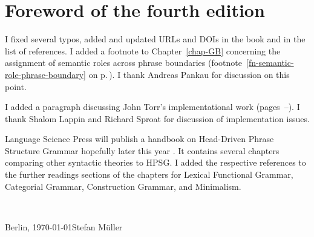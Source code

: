 
\section*{Foreword of the fourth edition}









I fixed several typos, added and updated URLs and DOIs in the book and in the list of references.
I added a footnote to Chapter~\ref{chap-GB} concerning the assignment of semantic roles
across phrase boundaries (footnote~\ref{fn-semantic-role-phrase-boundary} on
p.\,\pageref{fn-semantic-role-phrase-boundary}). I thank Andreas Pankau for discussion on this point.

I added a paragraph discussing John Torr's implementational work (pages~\pageref{page-torr-implementation-beginning}--\pageref{page-torr-implementation-end}). I thank Shalom Lappin and Richard Sproat for discussion of implementation issues.

Language Science Press will publish a handbook on Head-Driven Phrase Structure Grammar hopefully
later this year \citep{HPSGHandbook}. It contains several chapters comparing other syntactic
theories to HPSG. I added the respective references to the further readings sections of the chapters
for Lexical Functional Grammar, Categorial Grammar, Construction Grammar, and Minimalism.


~\medskip

\noindent
Berlin, \today\hfill Stefan Müller



